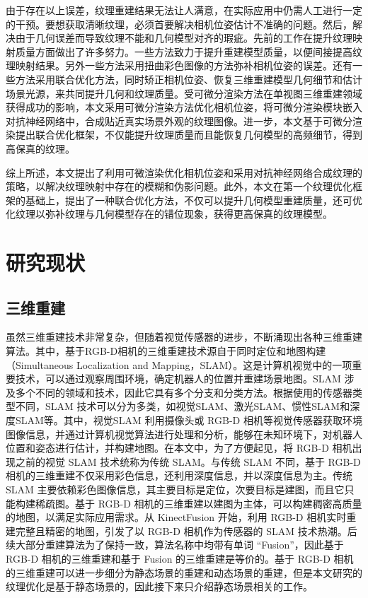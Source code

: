 由于存在以上误差，纹理重建结果无法让人满意，在实际应用中仍需人工进行一定的干预。要想获取清晰纹理，必须首要解决相机位姿估计不准确的问题。然后，解决由于几何误差而导致纹理不能和几何模型对齐的瑕疵。先前的工作在提升纹理映射质量方面做出了许多努力。一些方法致力于提升重建模型质量，以便间接提高纹理映射结果。另外一些方法采用扭曲彩色图像的方法弥补相机位姿的误差。还有一些方法采用联合优化方法，同时矫正相机位姿、恢复三维重建模型几何细节和估计场景光源，来共同提升几何和纹理质量。受可微分渲染方法在单视图三维重建领域获得成功的影响，本文采用可微分渲染方法优化相机位姿，将可微分渲染模块嵌入对抗神经网络中，合成贴近真实场景外观的纹理图像。进一步，本文基于可微分渲染提出联合优化框架，不仅能提升纹理质量而且能恢复几何模型的高频细节，得到高保真的纹理。\par
综上所述，本文提出了利用可微渲染优化相机位姿和采用对抗神经网络合成纹理的策略，以解决纹理映射中存在的模糊和伪影问题。此外，本文在第一个纹理优化框架的基础上，提出了一种联合优化方法，不仅可以提升几何模型重建质量，还可优化纹理以弥补纹理与几何模型存在的错位现象，获得更高保真的纹理模型。
\section{研究现状}
\subsection{三维重建}
虽然三维重建技术非常复杂，但随着视觉传感器的进步，不断涌现出各种三维重建算法。其中，基于RGB-D相机的三维重建技术源自于同时定位和地图构建（Simultaneous Localization and Mapping，SLAM）。这是计算机视觉中的一项重要技术，可以通过观察周围环境，确定机器人的位置并重建场景地图。SLAM 涉及多个不同的领域和技术，因此它具有多个分支和分类方法。根据使用的传感器类型不同，SLAM 技术可以分为多类，如视觉SLAM、激光SLAM、惯性SLAM和深度SLAM等。其中，视觉SLAM 利用摄像头或 RGB-D 相机等视觉传感器获取环境图像信息，并通过计算机视觉算法进行处理和分析，能够在未知环境下，对机器人位置和姿态进行估计，并构建地图。在本文中，为了方便起见，将 RGB-D 相机出现之前的视觉 SLAM 技术统称为传统 SLAM。与传统 SLAM 不同，基于 RGB-D 相机的三维重建不仅采用彩色信息，还利用深度信息，并以深度信息为主。传统 SLAM 主要依赖彩色图像信息，其主要目标是定位，次要目标是建图，而且它只能构建稀疏图。基于 RGB-D 相机的三维重建以建图为主体，可以构建稠密高质量的地图，以满足实际应用需求。从 KinectFusion 开始，利用 RGB-D 相机实时重建完整且精密的地图，引发了以 RGB-D 相机作为传感器的 SLAM 技术热潮。后续大部分重建算法为了保持一致，算法名称中均带有单词 “Fusion”，因此基于 RGB-D 相机的三维重建和基于 Fusion 的三维重建是等价的。基于 RGB-D 相机的三维重建可以进一步细分为静态场景的重建和动态场景的重建，但是本文研究的纹理优化是基于静态场景的，因此接下来只介绍静态场景相关的工作。\par


